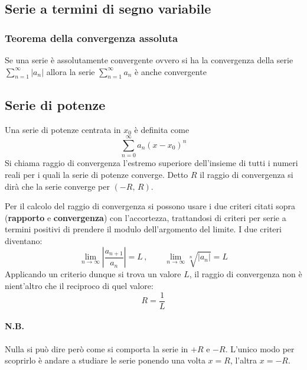 \documentclass[10pt,a4paper]{report}
\begin{document}
\subsection*{Serie a termini di segno variabile}
                
\subsubsection{Teorema della convergenza assoluta}
Se una serie è assolutamente convergente ovvero si ha la convergenza della serie $ \sum_{n=1}^{\infty} |a_{n}| $ allora la serie $ \sum_{n=1}^{\infty} a_{n} $ è anche convergente

\subsection*{Serie di potenze}
Una serie di potenze centrata in $x_0$ è definita come
\[\sum_{n=0}^\infty a_n (x-x_0)^n\]
Si chiama raggio di convergenza l'estremo superiore dell'insieme di tutti i numeri reali per i quali la serie di potenze converge. Detto $R$ il raggio di convergenza si dirà che la serie converge per $(-R,\,R)$. \medskip

Per il calcolo del raggio di convergenza si possono usare i due criteri citati sopra (\textbf{rapporto} e \textbf{convergenza}) con l'accortezza, trattandosi di criteri per serie a termini positivi di prendere il modulo dell'argomento del limite. I due criteri diventano:
\[
\lim_{n \to \infty} \left\lvert\frac{a_{n+1}}{a_{n}}\right\rvert = L\,,\qquad
\lim_{n \to \infty} \sqrt[n]{\lvert a_{n}\rvert} = L
 \]
Applicando un criterio dunque si trova un valore $L$, il raggio di convergenza non è nient'altro che il reciproco di quel valore:
\[R=\frac{1}{L}\]
\paragraph{N.B.} Nulla si può dire però come si comporta la serie in $+R$ e $-R$. L'unico modo per scoprirlo è andare a studiare le serie ponendo una volta $x=R$, l'altra $x=-R$.
\end{document}
